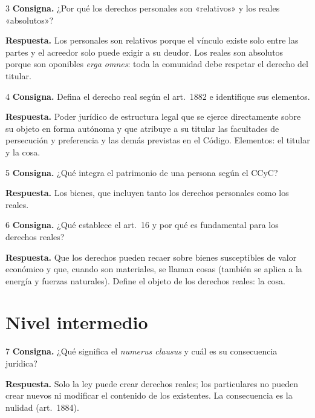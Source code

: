 \documentclass[12pt,oneside]{book}
\begin{document}
\begin{ejercicio}{3}
\textbf{Consigna.} ¿Por qué los derechos personales son «relativos» y los reales «absolutos»?

\textbf{Respuesta.} Los personales son relativos porque el vínculo existe solo entre las partes y el acreedor solo puede exigir a su deudor. Los reales son absolutos porque son oponibles \textit{erga omnes}: toda la comunidad debe respetar el derecho del titular.
\end{ejercicio}

\begin{ejercicio}{4}
\textbf{Consigna.} Defina el derecho real según el art.~1882 e identifique sus elementos.

\textbf{Respuesta.} Poder jurídico de estructura legal que se ejerce directamente sobre su objeto en forma autónoma y que atribuye a su titular las facultades de persecución y preferencia y las demás previstas en el Código. Elementos: el titular y la cosa.
\end{ejercicio}

\begin{ejercicio}{5}
\textbf{Consigna.} ¿Qué integra el patrimonio de una persona según el CCyC?

\textbf{Respuesta.} Los bienes, que incluyen tanto los derechos personales como los reales.
\end{ejercicio}

\begin{ejercicio}{6}
\textbf{Consigna.} ¿Qué establece el art.~16 y por qué es fundamental para los derechos reales?

\textbf{Respuesta.} Que los derechos pueden recaer sobre bienes susceptibles de valor económico y que, cuando son materiales, se llaman cosas (también se aplica a la energía y fuerzas naturales). Define el objeto de los derechos reales: la cosa.
\end{ejercicio}

\section{Nivel intermedio}

\begin{ejercicio}{7}
\textbf{Consigna.} ¿Qué significa el \textit{numerus clausus} y cuál es su consecuencia jurídica?

\textbf{Respuesta.} Solo la ley puede crear derechos reales; los particulares no pueden crear nuevos ni modificar el contenido de los existentes. La consecuencia es la nulidad (art.~1884).
\end{ejercicio}
\end{document}
